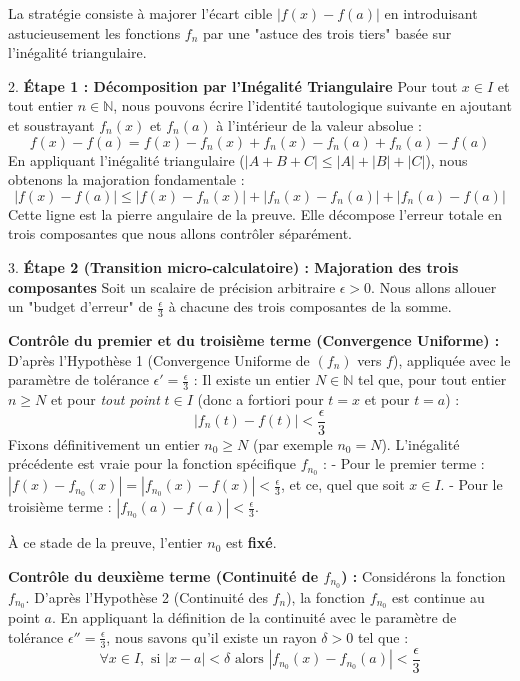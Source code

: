 \documentclass{report}
\begin{document}
   La stratégie consiste à majorer l'écart cible $|f(x) - f(a)|$ en introduisant astucieusement les fonctions $f_n$ par une "astuce des trois tiers" basée sur l'inégalité triangulaire.

2. \textbf{Étape 1 : Décomposition par l'Inégalité Triangulaire}
   Pour tout $x \in I$ et tout entier $n \in \mathbb{N}$, nous pouvons écrire l'identité tautologique suivante en ajoutant et soustrayant $f_n(x)$ et $f_n(a)$ à l'intérieur de la valeur absolue :
   $$ f(x) - f(a) = f(x) - f_n(x) + f_n(x) - f_n(a) + f_n(a) - f(a) $$
   En appliquant l'inégalité triangulaire ($|A + B + C| \le |A| + |B| + |C|$), nous obtenons la majoration fondamentale :
   $$ |f(x) - f(a)| \le |f(x) - f_n(x)| + |f_n(x) - f_n(a)| + |f_n(a) - f(a)| $$
   Cette ligne est la pierre angulaire de la preuve. Elle décompose l'erreur totale en trois composantes que nous allons contrôler séparément.

3. \textbf{Étape 2 (Transition micro-calculatoire) : Majoration des trois composantes}
   Soit un scalaire de précision arbitraire $\epsilon > 0$. Nous allons allouer un "budget d'erreur" de $\frac{\epsilon}{3}$ à chacune des trois composantes de la somme.

   \textbf{Contrôle du premier et du troisième terme (Convergence Uniforme) :}
   D'après l'Hypothèse 1 (Convergence Uniforme de $(f_n)$ vers $f$), appliquée avec le paramètre de tolérance $\epsilon' = \frac{\epsilon}{3}$ :
   Il existe un entier $N \in \mathbb{N}$ tel que, pour tout entier $n \ge N$ et pour \textit{tout point} $t \in I$ (donc a fortiori pour $t=x$ et pour $t=a$) :
   $$ |f_n(t) - f(t)| < \frac{\epsilon}{3} $$
   Fixons définitivement un entier $n_0 \ge N$ (par exemple $n_0 = N$). L'inégalité précédente est vraie pour la fonction spécifique $f_{n_0}$ :
   - Pour le premier terme : $|f(x) - f_{n_0}(x)| = |f_{n_0}(x) - f(x)| < \frac{\epsilon}{3}$, et ce, quel que soit $x \in I$.
   - Pour le troisième terme : $|f_{n_0}(a) - f(a)| < \frac{\epsilon}{3}$.

   À ce stade de la preuve, l'entier $n_0$ est \textbf{fixé}.

   \textbf{Contrôle du deuxième terme (Continuité de $f_{n_0}$) :}
   Considérons la fonction $f_{n_0}$. D'après l'Hypothèse 2 (Continuité des $f_n$), la fonction $f_{n_0}$ est continue au point $a$.
   En appliquant la définition de la continuité avec le paramètre de tolérance $\epsilon'' = \frac{\epsilon}{3}$, nous savons qu'il existe un rayon $\delta > 0$ tel que :
   $$ \forall x \in I, \text{ si } |x - a| < \delta \text{ alors } |f_{n_0}(x) - f_{n_0}(a)| < \frac{\epsilon}{3} $$
\end{document}
